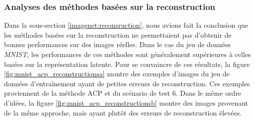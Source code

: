 \subsubsection{Analyses des méthodes basées sur la reconstruction} \label{mnist:reconsruction}

Dans la sous-section \ref{imagenet:reconsruction}, nous avions fait la conclusion que les méthodes basées sur la reconstruction ne permettaient pas d'obtenir de bonnes performances sur des images réelles. Dans le cas du jeu de données \textit{MNIST}, les performances de ces méthodes sont généralement supérieures à celles basées sur la représentation latente. Pour se convaincre de ces résultats, la figure \ref{fig:mnist_acp_reconstructionsa} montre des exemples d'images du jeu de données d'entraînement ayant de petites erreurs de reconstruction. Ces exemples proviennent de la méthode ACP et du scénario de test 6.  Dans le même ordre d'idées, la figure \ref{fig:mnist_acp_reconstructionsb} montre des images provenant de la même approche, mais ayant plutôt des erreurs de reconstruction élevées. 

